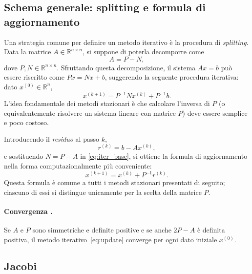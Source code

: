 \documentclass[a4paper,12pt]{article}
\begin{document}
\subsection{Schema generale: splitting e formula di aggiornamento}
 
Una strategia comune per definire un metodo iterativo è la procedura di
\emph{splitting}. Data la matrice $A \in \mathbb{R}^{n \times n}$, si suppone di
poterla decomporre come
\begin{equation}
    A = P - N,
    \label{eq:splitting}
\end{equation}
dove $P, N \in \mathbb{R}^{n \times n}$. Sfruttando questa decomposizione, il sistema
$Ax = b$ può essere riscritto come $Px = Nx + b$, suggerendo la seguente
procedura iterativa: dato $x^{(0)} \in \mathbb{R}^n$,
\begin{equation}
    x^{(k+1)} = P^{-1} N x^{(k)} + P^{-1} b.
    \label{eq:iter_base}
\end{equation}
L'idea fondamentale dei metodi stazionari è che calcolare l'inversa di $P$
(o equivalentemente risolvere un sistema lineare con matrice $P$) deve essere
semplice e poco costoso.
 
Introducendo il \emph{residuo} al passo $k$,
\begin{equation}
    r^{(k)} = b - A x^{(k)},
\end{equation}
e sostituendo $N = P - A$ in \eqref{eq:iter_base}, si ottiene la formula di
aggiornamento nella forma computazionalmente più conveniente:
\begin{equation}
    x^{(k+1)} = x^{(k)} + P^{-1} r^{(k)}.
    \label{eq:update}
\end{equation}
Questa formula è comune a tutti i metodi stazionari presentati di seguito;
ciascuno di essi si distingue unicamente per la scelta della matrice $P$.

\paragraph{Convergenza .}
Se $A$ e $P$ sono simmetriche e definite positive e se anche $2P - A$ è
definita positiva, il metodo iterativo~\eqref{eq:update} converge per ogni
dato iniziale $x^{(0)}$.
 
\subsection{Jacobi}
\label{subsec:jacobi}
\end{document}
